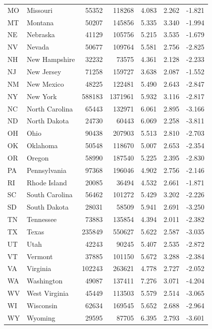 \begin{tabular}{llrrrrr}
MO & Missouri & 55352 & 118268 & 4.083 & 2.262 & -1.821 \\
MT & Montana & 50207 & 145856 & 5.335 & 3.340 & -1.994 \\
NE & Nebraska & 41129 & 105756 & 5.215 & 3.535 & -1.679 \\
NV & Nevada & 50677 & 109764 & 5.581 & 2.756 & -2.825 \\
NH & New Hampshire & 32232 & 73575 & 4.361 & 2.128 & -2.233 \\
NJ & New Jersey & 71258 & 159727 & 3.638 & 2.087 & -1.552 \\
NM & New Mexico & 48225 & 122481 & 5.490 & 2.643 & -2.847 \\
NY & New York & 588183 & 1371961 & 5.932 & 3.116 & -2.817 \\
NC & North Carolina & 65443 & 132971 & 6.061 & 2.895 & -3.166 \\
ND & North Dakota & 24730 & 60443 & 6.069 & 2.258 & -3.811 \\
OH & Ohio & 90438 & 207903 & 5.513 & 2.810 & -2.703 \\
OK & Oklahoma & 50548 & 118670 & 5.007 & 2.653 & -2.354 \\
OR & Oregon & 58990 & 187540 & 5.225 & 2.395 & -2.830 \\
PA & Pennsylvania & 97368 & 196046 & 4.902 & 2.756 & -2.146 \\
RI & Rhode Island & 20085 & 36494 & 4.532 & 2.661 & -1.871 \\
SC & South Carolina & 56462 & 101272 & 5.429 & 3.202 & -2.226 \\
SD & South Dakota & 28031 & 58509 & 5.941 & 2.691 & -3.250 \\
TN & Tennessee & 73883 & 135854 & 4.394 & 2.011 & -2.382 \\
TX & Texas & 235849 & 550627 & 5.622 & 2.587 & -3.035 \\
UT & Utah & 42243 & 90245 & 5.407 & 2.535 & -2.872 \\
VT & Vermont & 37885 & 101150 & 5.672 & 3.288 & -2.384 \\
VA & Virginia & 102243 & 263621 & 4.778 & 2.727 & -2.052 \\
WA & Washington & 49087 & 137411 & 7.276 & 3.071 & -4.204 \\
WV & West Virginia & 45449 & 113503 & 5.579 & 2.514 & -3.065 \\
WI & Wisconsin & 62634 & 169545 & 5.652 & 2.688 & -2.964 \\
WY & Wyoming & 29595 & 87705 & 6.395 & 2.793 & -3.601 \\
\bottomrule
\end{tabular}
